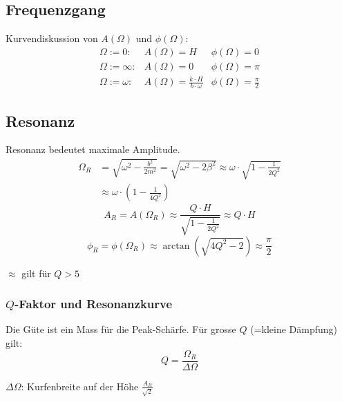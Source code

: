 \subsection{Frequenzgang}
Kurvendiskussion von $A(\Omega)$ und $\phi(\Omega)$:
\[\begin{matrix}
	\Omega := 0: & A(\Omega) = H & \phi(\Omega) = 0 \\ 
	\Omega := \infty: & A(\Omega) = 0 & \phi(\Omega) = \pi \\ 
	\Omega := \omega: & A(\Omega) = \frac{k \cdot H}{b \cdot \omega} & \phi(\Omega) = \frac{\pi}{2}
\end{matrix} \]


\subsection{Resonanz}
Resonanz bedeutet maximale Amplitude.
\[\boxed{\begin{aligned}
	\Omega_R &= \sqrt{\omega^2 - \frac{b^2}{2m^2}}
	         = \sqrt{\omega^2 - 2\beta^2}
	         \approx \omega \cdot \sqrt{1 - \frac{1}{2Q^2}}\\
	         &\approx \omega \cdot \left( 1 - \frac{1}{4Q^2} \right)
\end{aligned}}\]
\[\boxed{
	A_R = A(\Omega_R) \approx \frac{Q \cdot H}{\sqrt{1 - \frac{1}{2Q^2}}} \approx Q \cdot H
}\]
\[\boxed{
	\phi_R = \phi(\Omega_R) \approx \arctan \left( \sqrt{4Q^2 - 2} \right) \approx \frac{\pi}{2}
}\]
\begin{footnotesize}
	$\approx$ gilt für $Q>5$
\end{footnotesize}

\subsubsection{$Q$-Faktor und Resonanzkurve}
Die Güte ist ein Mass für die Peak-Schärfe. Für grosse $Q$ (=kleine Dämpfung) gilt:
\[\boxed{
	Q = \frac{\Omega_R}{\Delta \Omega}
}\]
\begin{footnotesize}
	$\Delta \Omega$: Kurfenbreite auf der Höhe $\frac{A_R}{\sqrt2}$
\end{footnotesize}